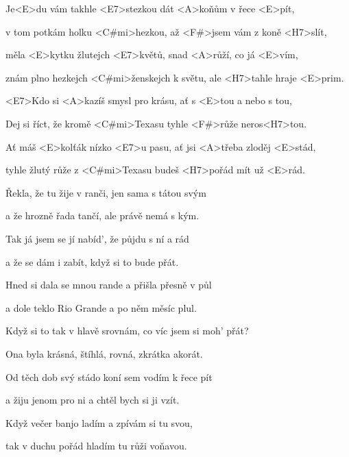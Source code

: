 

\zs
Je<E>du vám takhle <E7>stezkou dát <A>koňům v řece <E>pít,

v tom potkám holku <C#mi>hezkou, až <F#>jsem vám z koně <H7>slít,

měla <E>kytku žlutejch <E7>květů, snad <A>růží, co já <E>vím,

znám plno hezkejch <C#mi>ženskejch k světu, ale <H7>tahle hraje <E>prim.
\ks

\zr
<E7>Kdo si <A>kazíš smysl pro krásu, ať s <E>tou a nebo s tou,

Dej si říct, že kromě <C#mi>Texasu tyhle <F#>růže neros<H7>tou.

Ať máš <E>kolťák nízko <E7>u pasu, ať jsi <A>třeba zloděj <E>stád,

tyhle žlutý růže z <C#mi>Texasu budeš <H7>pořád mít už <E>rád.
\kr

\zs
Řekla, že tu žije v ranči, jen sama s tátou svým

a že hrozně řada tančí, ale právě nemá s kým.

Tak já jsem se jí nabíd', že půjdu s ní a rád

a že se dám i zabít, když si to bude přát.
\ks

\zs
Hned si dala se mnou rande a přišla přesně v půl

a dole teklo Rio Grande a po něm měsíc plul.

Když si to tak v hlavě srovnám, co víc jsem si moh' přát?

Ona byla krásná, štíhlá, rovná, zkrátka akorát.
\ks

\zr \kr

\zs
Od těch dob svý stádo koní sem vodím k řece pít

a žiju jenom pro ni a chtěl bych si ji vzít.

Když večer banjo ladím a zpívám si tu svou,

tak v duchu pořád hladím tu růži voňavou.
\ks

\zr \kr

\kp
